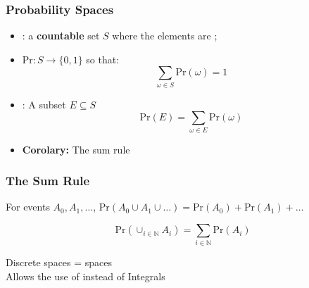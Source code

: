 \documentclass{beamer}
\begin{document}
\begin{frame}
  \frametitle{Probability Spaces}

  {\large
    \begin{itemize}
    \item {}: a {\bf countable} set $S$ where the
      elements are ;
      \bigskip

    \item {} $\text{Pr}: S \to
      \{0,1\}$ so that:
      \begin{equation*}
        \sum_{\omega \in S}\text{Pr}(\omega) = 1
      \end{equation*}
      \bigskip

    \item {}: A subset $E \subseteq S$
      \begin{equation*}
        \text{Pr}(E) = \sum_{\omega \in E} \text{Pr}(\omega)
      \end{equation*}
      \bigskip
      
    \item {\bf Corolary:} The sum rule
      
    \end{itemize}
  }
\end{frame}

\begin{frame}
  \frametitle{The Sum Rule}

  {\large
    For  events $A_0, A_1, \ldots$,
    \bigskip
    $\text{Pr}(A_0 \cup A_1 \cup \ldots) =
    \text{Pr}(A_0)+\text{Pr}(A_1) + \ldots$
    \bigskip

    \begin{equation*}
      \text{Pr}(\cup_{i\in\mathbb{N}}A_i) = \sum_{i\in\mathbb{N}}\text{Pr}(A_i)
    \end{equation*}

    \bigskip

    \alert{Discrete} spaces =  spaces\\
    Allows the use of  instead of \alert{Integrals}
    
  }
\end{frame}
\end{document}
